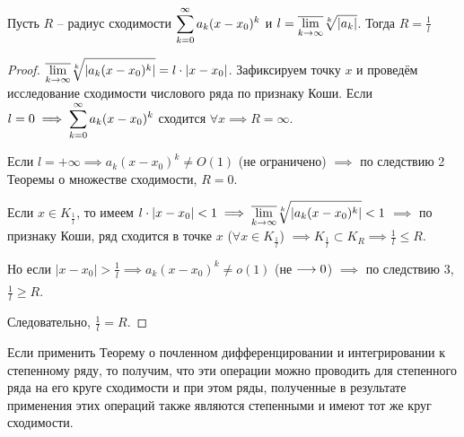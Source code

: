 \begin{theorem}
    Пусть $R$ -- радиус сходимости $\displaystyle\sum_{k=0}^\infty a_k (x - x_0)^k$ и 
    $l = \displaystyle\overline{\lim_{k \to \infty}} \sqrt[k]{|a_k|}$.
    Тогда $R = \frac{1}{l}$
\end{theorem}
\begin{proof}
    $\displaystyle\overline{\lim_{k \to \infty}} \sqrt[k]{|a_k (x -x_0)^k|}
    = l \cdot |x - x_0|$. Зафиксируем точку $x$ и проведём исследование
    сходимости числового ряда по признаку Коши. Если $l = 0 \implies
    \displaystyle\sum_{k=0}^\infty a_k (x - x_0)^k$ сходится $\forall x \implies R = \infty$.

    Если $l = +\infty \implies a_k (x - x_0)^k \neq O(1)$ (не ограничено)
    $\implies$ по следствию 2 Теоремы о множестве сходимости, $R = 0$.

    Если $x \in K_{\frac{1}{l}}$, то имеем $l \cdot |x - x_0| < 1 \implies
    \displaystyle\overline{\lim_{k \to \infty}} \sqrt[k]{|a_k (x -x_0)^k|} < 1$
    $\implies$ по признаку Коши, ряд сходится в точке $x$
    ($\forall x \in K_{\frac{1}{l}}$) 
    $\implies K_{\frac{1}{l}} \subset K_R \implies \frac{1}{l} \leq R$.

    Но если $|x - x_0| > \frac{1}{l} \implies a_k (x - x_0)^k \neq o(1)$
    (не $\underset{}{\longrightarrow} 0$) $\implies$ по следствию 3, $\frac{1}{l} \geq R$.

    Следовательно, $\frac{1}{l} = R$.
\end{proof}

\begin{remark}
    Если применить Теорему о почленном дифференцировании и интегрировании к
    степенному ряду, то получим, что эти операции можно проводить для
    степенного ряда на его круге сходимости и при этом ряды, полученные в
    результате применения этих операций также являются степенными и имеют
    тот же круг сходимости.
\end{remark}